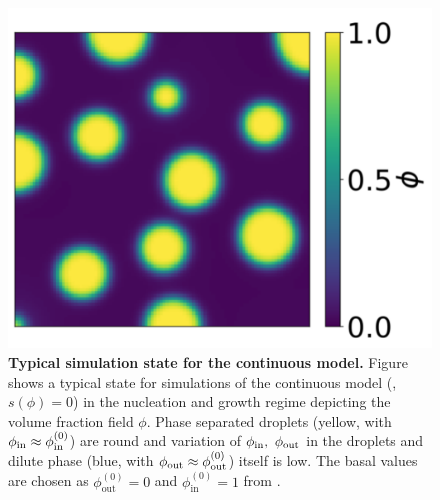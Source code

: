\begin{figure}[tb]
\centering
\includegraphics[scale=0.35]{MainContent/Figures/Simulation_CH_Passive.pdf}
\caption{\textbf{Typical simulation state for the continuous model.}
Figure shows a typical state for simulations of the continuous model (, $s(\phi) = 0$) in the nucleation and growth regime depicting the volume fraction field $\phi$.
Phase separated droplets (yellow, with $\phi_\mathrm{in} \approx \phi^{(0)}_\mathrm{in}$) are round and variation of $\phi_\mathrm{in},~\phi_\mathrm{out}$ in the droplets and dilute phase (blue, with $\phi_\mathrm{out} \approx \phi^{(0)}_\mathrm{out}$) itself is low.
The basal values are chosen as $\phi^{(0)}_\mathrm{out} = 0$ and $\phi^{(0)}_\mathrm{in} = 1$ from .
}
\label{fig:schematics_CH}
\end{figure}

